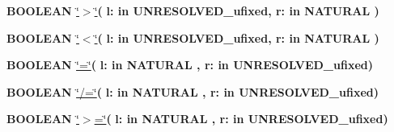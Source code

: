 \begin{DoxyCompactItemize}
\item 
{\bfseries {\bfseries \textcolor{comment}{B\+O\+O\+L\+E\+A\+N}\textcolor{vhdlchar}{ }}} \hyperlink{classfixed__pkg_ac6c82329bf849852be997a3d0a737cf9}{\char`\"{}$>$\char`\"{}}{\bfseries  ( }{\bfseries \textcolor{vhdlchar}{l\+: }\textcolor{stringliteral}{in }\textcolor{vhdlchar}{U\+N\+R\+E\+S\+O\+L\+V\+E\+D\+\_\+ufixed}}{\bfseries  , \textcolor{vhdlchar}{r\+: }\textcolor{stringliteral}{in }{\bfseries \textcolor{comment}{N\+A\+T\+U\+R\+A\+L}\textcolor{vhdlchar}{ }}}{\bfseries  )} 
\item 
{\bfseries {\bfseries \textcolor{comment}{B\+O\+O\+L\+E\+A\+N}\textcolor{vhdlchar}{ }}} \hyperlink{classfixed__pkg_a5d059cf3277e3585e4f3f076db10b273}{\char`\"{}$<$\char`\"{}}{\bfseries  ( }{\bfseries \textcolor{vhdlchar}{l\+: }\textcolor{stringliteral}{in }\textcolor{vhdlchar}{U\+N\+R\+E\+S\+O\+L\+V\+E\+D\+\_\+ufixed}}{\bfseries  , \textcolor{vhdlchar}{r\+: }\textcolor{stringliteral}{in }{\bfseries \textcolor{comment}{N\+A\+T\+U\+R\+A\+L}\textcolor{vhdlchar}{ }}}{\bfseries  )} 
\item 
{\bfseries {\bfseries \textcolor{comment}{B\+O\+O\+L\+E\+A\+N}\textcolor{vhdlchar}{ }}} \hyperlink{classfixed__pkg_a7949e9258ea0749e3b35961feea8db87}{\char`\"{}=\char`\"{}}{\bfseries  ( }{\bfseries \textcolor{vhdlchar}{l\+: }\textcolor{stringliteral}{in }{\bfseries \textcolor{comment}{N\+A\+T\+U\+R\+A\+L}\textcolor{vhdlchar}{ }}}{\bfseries  , \textcolor{vhdlchar}{r\+: }\textcolor{stringliteral}{in }\textcolor{vhdlchar}{U\+N\+R\+E\+S\+O\+L\+V\+E\+D\+\_\+ufixed}}{\bfseries  )} 
\item 
{\bfseries {\bfseries \textcolor{comment}{B\+O\+O\+L\+E\+A\+N}\textcolor{vhdlchar}{ }}} \hyperlink{classfixed__pkg_a00087aded97b434060226b9ba63a9077}{\char`\"{}/=\char`\"{}}{\bfseries  ( }{\bfseries \textcolor{vhdlchar}{l\+: }\textcolor{stringliteral}{in }{\bfseries \textcolor{comment}{N\+A\+T\+U\+R\+A\+L}\textcolor{vhdlchar}{ }}}{\bfseries  , \textcolor{vhdlchar}{r\+: }\textcolor{stringliteral}{in }\textcolor{vhdlchar}{U\+N\+R\+E\+S\+O\+L\+V\+E\+D\+\_\+ufixed}}{\bfseries  )} 
\item 
{\bfseries {\bfseries \textcolor{comment}{B\+O\+O\+L\+E\+A\+N}\textcolor{vhdlchar}{ }}} \hyperlink{classfixed__pkg_a4cd07e388cdbb3996dd11f56781d3758}{\char`\"{}$>$=\char`\"{}}{\bfseries  ( }{\bfseries \textcolor{vhdlchar}{l\+: }\textcolor{stringliteral}{in }{\bfseries \textcolor{comment}{N\+A\+T\+U\+R\+A\+L}\textcolor{vhdlchar}{ }}}{\bfseries  , \textcolor{vhdlchar}{r\+: }\textcolor{stringliteral}{in }\textcolor{vhdlchar}{U\+N\+R\+E\+S\+O\+L\+V\+E\+D\+\_\+ufixed}}{\bfseries  )} 

\end{DoxyCompactItemize}
